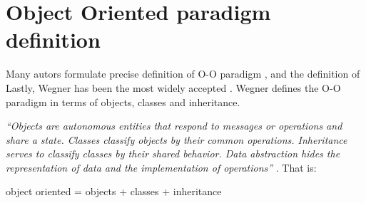 \section{Object Oriented paradigm definition}


Many autors formulate precise 
definition of O-O paradigm 
\cite{Rentsch:1982} 
\cite{Pascoe:1986}
\cite{Nygaard:1986}
\cite{Madsen:1988}, 
and the definition of Lastly, Wegner 
\cite{Wegner:1987} has been 
the most widely 
accepted \cite{Capretz:2003}. Wegner defines 
the O-O paradigm in terms of objects, 
classes and inheritance.

\emph{
	``Objects are autonomous entities 
	that respond to messages or operations and share 
	a state. Classes classify objects by their common 
	operations. Inheritance serves to classify classes by 
	their shared behavior. Data abstraction hides the 
	representation of data and the implementation of 
	operations'' 
}\cite{Wegner:1987}. That is: 

object oriented = objects + classes + inheritance

